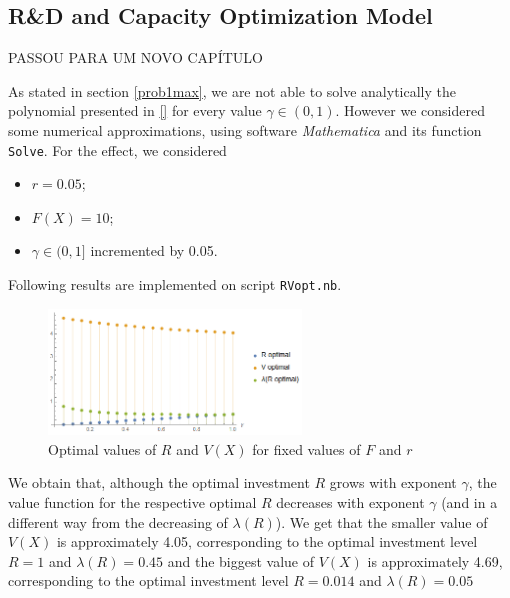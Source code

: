 \subsection{R\&D and Capacity Optimization Model}
\label{subsec:RDcap1}

PASSOU PARA UM NOVO CAPÍTULO

As stated in section \ref{prob1max}, we are not able to solve analytically the polynomial presented in \eqref{} for every value $\gamma \in (0,1)$. However we considered some numerical approximations, using software \textit{Mathematica} and its function \texttt{Solve}. For the effect, we considered 
\begin{itemize}
	\item $r=0.05$;
	\item $F(X)=10$;
	\item $\gamma \in (0,1]$ incremented by 0.05.
\end{itemize}

Following results are implemented on script \texttt{RVopt.nb}.


\begin{figure}[!htb]
	\centering
	\includegraphics[width=0.6\textwidth]{Prob1_MaxProb/RVlambda_opt05.PNG}
	\caption{Optimal values of $R$ and $V(X)$ for fixed values of $F$ and $r$}
\end{figure}

We obtain that, although the optimal investment $R$ grows with exponent $\gamma$, the value function for the respective optimal $R$ decreases with exponent $\gamma$ (and in a different way from the decreasing of $\lambda(R)$). We get that the smaller value of $V(X)$ is approximately 4.05, corresponding to the optimal investment level $R=1$ and $\lambda(R)=0.45$ and the biggest value of $V(X)$ is approximately 4.69, corresponding to the optimal investment level $R=0.014$ and $\lambda(R)=0.05$